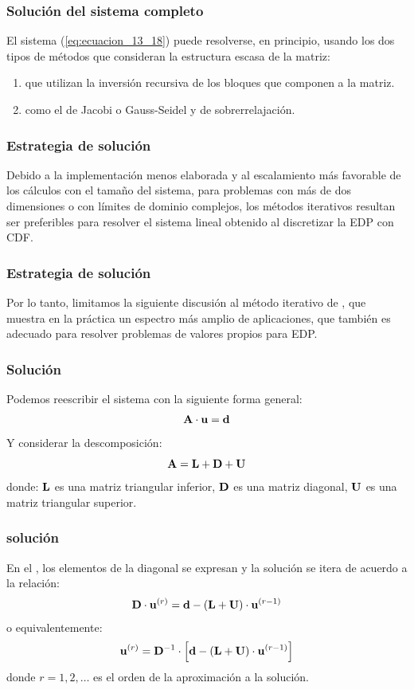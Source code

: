 \documentclass[12pt]{beamer}
\begin{document}
\begin{frame}
\frametitle{Solución del sistema completo}
El sistema (\ref{eq:ecuacion_13_18}) puede resolverse, en principio, usando los dos tipos de métodos que consideran la estructura escasa de la matriz:
\pause
{}
\begin{enumerate}[<+->]
\item {} que utilizan la inversión recursiva de los bloques que componen a la matriz.
\item {} como el de Jacobi o Gauss-Seidel y de sobrerrelajación.
\end{enumerate}
\end{frame}
\begin{frame}
\frametitle{Estrategia de solución}
Debido a la implementación menos elaborada y al escalamiento más favorable de los cálculos con el tamaño del sistema, para problemas con más de dos dimensiones o con límites de dominio complejos, los métodos iterativos resultan ser preferibles para resolver el sistema lineal obtenido al discretizar la EDP con CDF.
\end{frame}
\begin{frame}
\frametitle{Estrategia de solución}
Por lo tanto, limitamos la siguiente discusión al método iterativo de , que muestra en la práctica un espectro más amplio de aplicaciones, que también es adecuado para resolver problemas de valores propios para EDP.
\end{frame}
\begin{frame}
\frametitle{Solución}
Podemos reescribir el sistema con la siguiente forma general:
\pause
\begin{align}
\vb{A \cdot u} =  \vb{d}
\label{eq:ecuacion_13_19} 
\end{align}
\pause
Y considerar la descomposición:
\begin{equation}
\vb{A} = \vb{L} + \vb{D} + \vb{U}
\label{eq:ecuacion_13_20}
\end{equation}
donde: $\vb{L}$ es una matriz triangular inferior, $\vb{D}$ es una matriz diagonal, $\vb{U}$ es una matriz triangular superior.
\end{frame}
\begin{frame}
\frametitle{solución}
En el , los elementos de la diagonal se expresan y la solución se itera de acuerdo a la relación:
\pause
\begin{align*}
\vb{D} \cdot \vb{u}^{(r)} = \vb{d} - (\vb{L} + \vb{U}) \cdot \vb{u}^{(r-1)}
\end{align*}
o equivalentemente:
\pause
\begin{align}
\vb{u}^{(r)} = \vb{D}^{-1} \cdot \left[ \vb{d} - (\vb{L} + \vb{U}) \cdot \vb{u}^{(r-1)} \right]
\label{eq:ecuacion_13_21}
\end{align}
donde $r = 1, 2, \ldots$ es el orden de la aproximación a la solución.
\end{frame}
\end{document}

